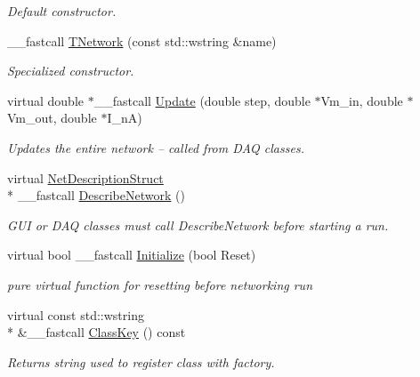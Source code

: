 \begin{DoxyCompactItemize}
\begin{DoxyCompactList}\small\item\em Default constructor. \end{DoxyCompactList}\item 
\hypertarget{class_t_network_a93f797373ab74025b7dea0d5c3568176}{\+\_\+\+\_\+fastcall \hyperlink{class_t_network_a93f797373ab74025b7dea0d5c3568176}{T\+Network} (const std\+::wstring \&name)}\label{class_t_network_a93f797373ab74025b7dea0d5c3568176}

\begin{DoxyCompactList}\small\item\em Specialized constructor. \end{DoxyCompactList}\item 
virtual double $\ast$\+\_\+\+\_\+fastcall \hyperlink{class_t_network_aa9ec65dcbbdad1ad67eaef33838a49c7}{Update} (double step, double $\ast$Vm\+\_\+in, double $\ast$Vm\+\_\+out, double $\ast$I\+\_\+n\+A)
\begin{DoxyCompactList}\small\item\em Updates the entire network -- called from D\+A\+Q classes. \end{DoxyCompactList}\item 
virtual \hyperlink{struct_net_description_struct}{Net\+Description\+Struct} \\*
\+\_\+\+\_\+fastcall \hyperlink{class_t_network_af0569ed2e0ecd9946996a030034510a3}{Describe\+Network} ()
\begin{DoxyCompactList}\small\item\em G\+U\+I or D\+A\+Q classes must call Describe\+Network before starting a run. \end{DoxyCompactList}\item 
\hypertarget{class_t_network_a2488896641ad4ceba1288ac86d0c6477}{virtual bool \+\_\+\+\_\+fastcall \hyperlink{class_t_network_a2488896641ad4ceba1288ac86d0c6477}{Initialize} (bool Reset)}\label{class_t_network_a2488896641ad4ceba1288ac86d0c6477}

\begin{DoxyCompactList}\small\item\em pure virtual function for resetting before networking run \end{DoxyCompactList}\item 
virtual const std\+::wstring \\*
\&\+\_\+\+\_\+fastcall \hyperlink{class_t_network_a9af68c6c12402bf185c1de44bab29a17}{Class\+Key} () const 
\begin{DoxyCompactList}\small\item\em Returns string used to register class with factory. \end{DoxyCompactList}\end{DoxyCompactItemize}
